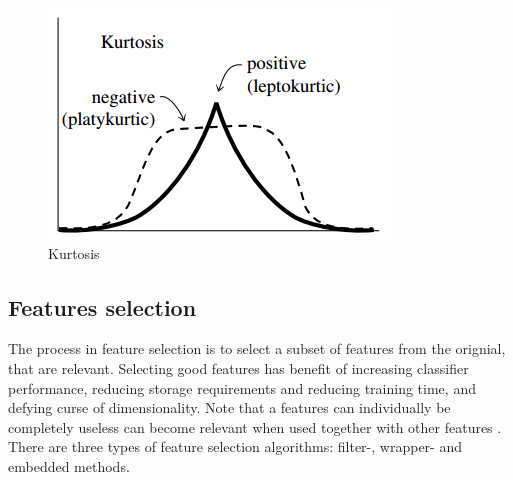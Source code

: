 \documentclass[USenglish]{ifimaster}  %
\begin{document}
\begin{figure}[h]
	\centering
	\includegraphics[scale=0.8]{Figures/Kurtosis}
	\caption{Kurtosis}
	\label{fig:kurtosis}
\end{figure}




\subsection{Features selection}\label{selection}
The process in feature selection is to select a subset of features from the orignial, that are relevant. Selecting good features has benefit of increasing classifier performance, reducing storage requirements and reducing training time, and defying curse of dimensionality. Note that a features can individually be completely useless can become relevant when used together with other features \cite{Guyon2006}. 
There are three types of feature selection algorithms: filter-, wrapper- and embedded methods.
\end{document}
